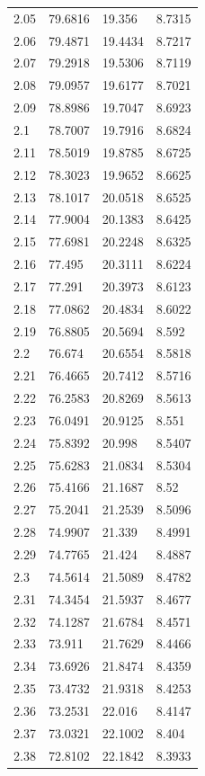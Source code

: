 \begin{tabular}{llll}
2.05 & 79.6816 & 19.356 & 8.7315 \\
2.06 & 79.4871 & 19.4434 & 8.7217 \\
2.07 & 79.2918 & 19.5306 & 8.7119 \\
2.08 & 79.0957 & 19.6177 & 8.7021 \\
2.09 & 78.8986 & 19.7047 & 8.6923 \\
2.1 & 78.7007 & 19.7916 & 8.6824 \\
2.11 & 78.5019 & 19.8785 & 8.6725 \\
2.12 & 78.3023 & 19.9652 & 8.6625 \\
2.13 & 78.1017 & 20.0518 & 8.6525 \\
2.14 & 77.9004 & 20.1383 & 8.6425 \\
2.15 & 77.6981 & 20.2248 & 8.6325 \\
2.16 & 77.495 & 20.3111 & 8.6224 \\
2.17 & 77.291 & 20.3973 & 8.6123 \\
2.18 & 77.0862 & 20.4834 & 8.6022 \\
2.19 & 76.8805 & 20.5694 & 8.592 \\
2.2 & 76.674 & 20.6554 & 8.5818 \\
2.21 & 76.4665 & 20.7412 & 8.5716 \\
2.22 & 76.2583 & 20.8269 & 8.5613 \\
2.23 & 76.0491 & 20.9125 & 8.551 \\
2.24 & 75.8392 & 20.998 & 8.5407 \\
2.25 & 75.6283 & 21.0834 & 8.5304 \\
2.26 & 75.4166 & 21.1687 & 8.52 \\
2.27 & 75.2041 & 21.2539 & 8.5096 \\
2.28 & 74.9907 & 21.339 & 8.4991 \\
2.29 & 74.7765 & 21.424 & 8.4887 \\
2.3 & 74.5614 & 21.5089 & 8.4782 \\
2.31 & 74.3454 & 21.5937 & 8.4677 \\
2.32 & 74.1287 & 21.6784 & 8.4571 \\
2.33 & 73.911 & 21.7629 & 8.4466 \\
2.34 & 73.6926 & 21.8474 & 8.4359 \\
2.35 & 73.4732 & 21.9318 & 8.4253 \\
2.36 & 73.2531 & 22.016 & 8.4147 \\
2.37 & 73.0321 & 22.1002 & 8.404 \\
2.38 & 72.8102 & 22.1842 & 8.3933 \\

\end{tabular}
